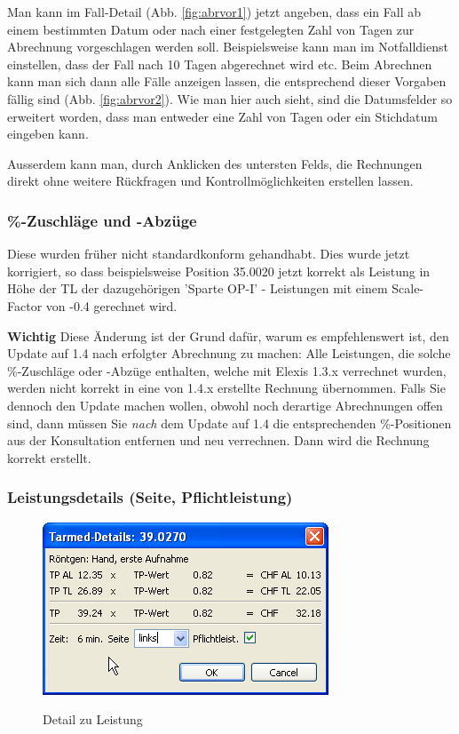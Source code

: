 \documentclass[a4paper]{scrartcl}
\begin{document}
Man kann im Fall-Detail (Abb. \ref{fig:abrvor1}) jetzt angeben, dass ein Fall ab einem bestimmten Datum oder nach einer festgelegten Zahl von Tagen zur Abrechnung vorgeschlagen werden soll. Beispielsweise kann man im Notfalldienst einstellen, dass der Fall nach 10 Tagen abgerechnet wird etc. Beim Abrechnen kann man sich dann alle Fälle anzeigen lassen, die entsprechend dieser Vorgaben fällig sind (Abb. \ref{fig:abrvor2}). Wie man hier auch sieht, sind die Datumsfelder so erweitert worden, dass man entweder eine Zahl von Tagen oder ein Stichdatum eingeben kann.

Ausserdem kann man, durch Anklicken des untersten Felds, die Rechnungen direkt ohne weitere Rückfragen und Kontrollmöglichkeiten erstellen lassen.

\subsubsection{\%-Zuschläge und -Abzüge}
Diese wurden früher nicht standardkonform gehandhabt. Dies wurde jetzt korrigiert, so dass beispielsweise Position 35.0020 jetzt korrekt als  Leistung in Höhe der TL der dazugehörigen 'Sparte OP-I' - Leistungen mit  einem Scale-Factor von -0.4 gerechnet wird.

\textbf{Wichtig} Diese Änderung ist der Grund dafür, warum es empfehlenswert ist, den Update auf 1.4 nach erfolgter Abrechnung zu machen: Alle Leistungen, die solche \%-Zuschläge oder -Abzüge enthalten, welche mit Elexis 1.3.x verrechnet wurden, werden nicht korrekt in eine von 1.4.x erstellte Rechnung übernommen. Falls Sie dennoch den Update machen wollen, obwohl noch derartige Abrechnungen offen sind, dann müssen Sie \textit{nach} dem Update auf 1.4 die entsprechenden \%-Positionen aus der Konsultation entfernen und neu verrechnen. Dann wird die Rechnung korrekt erstellt.

\subsubsection{Leistungsdetails (Seite, Pflichtleistung)}
\begin{figure}
  \includegraphics{tarmeddetail1}\\
  \caption{Detail zu Leistung}\label{fig:detail1}
\end{figure}
\end{document}
